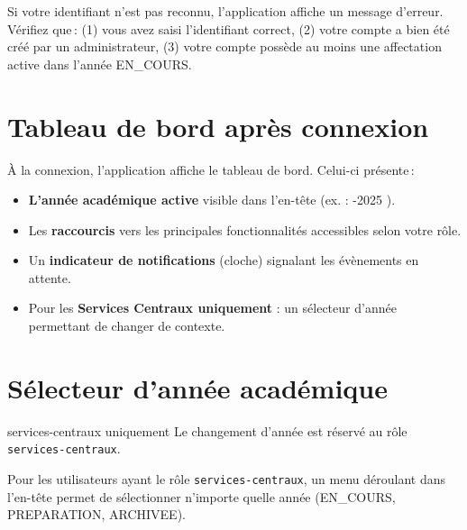 \begin{warnbox}
  Si votre identifiant n'est pas reconnu, l'application affiche un message d'erreur. V\'erifiez que\,: (1) vous avez saisi l'identifiant correct, (2) votre compte a bien \'et\'e cr\'e\'e par un administrateur, (3) votre compte poss\`ede au moins une affectation active dans l'ann\'ee EN\_COURS.
\end{warnbox}

\section{Tableau de bord apr\`es connexion}

\`A la connexion, l'application affiche le tableau de bord. Celui-ci pr\'esente\,:

\begin{itemize}
  \item \textbf{L'ann\'ee acad\'emique active} visible dans l'en-t\^ete (ex. : -2025 \fg).
  \item Les \textbf{raccourcis} vers les principales fonctionnalit\'es accessibles selon votre r\^ole.
  \item Un \textbf{indicateur de notifications} (cloche) signalant les \'ev\`enements en attente.
  \item Pour les \textbf{Services Centraux uniquement} : un s\'electeur d'ann\'ee permettant de changer de contexte.
\end{itemize}


\section{S\'electeur d'ann\'ee acad\'emique}

\begin{rolebox}{services-centraux uniquement}
  Le changement d'ann\'ee est r\'eserv\'e au r\^ole \texttt{services-centraux}.
\end{rolebox}

Pour les utilisateurs ayant le r\^ole \texttt{services-centraux}, un menu d\'eroulant dans l'en-t\^ete permet de s\'electionner n'importe quelle ann\'ee (EN\_COURS, PREPARATION, ARCHIVEE).

